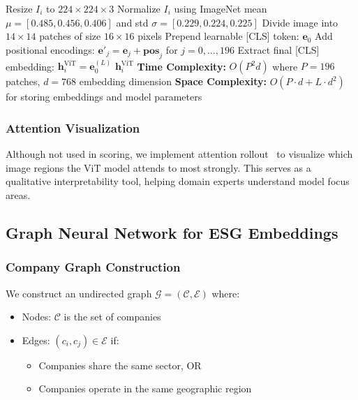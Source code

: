 \begin{algorithm}[H]
\caption{ViT Feature Extraction for ESG Assessment}
\label{alg:vit}
\BlankLine
Resize $I_i$ to $224 \times 224 \times 3$\;
Normalize $I_i$ using ImageNet mean $\mu = [0.485, 0.456, 0.406]$ and std $\sigma = [0.229, 0.224, 0.225]$\;
Divide image into $14 \times 14$ patches of size $16 \times 16$ pixels\;
Prepend learnable [CLS] token: $\mathbf{e}_0$\;
Add positional encodings: $\mathbf{e}'_j = \mathbf{e}_j + \mathbf{pos}_j$ for $j = 0, \ldots, 196$\;
Extract final [CLS] embedding: $\mathbf{h}_i^{\text{ViT}} = \mathbf{e}^{(L)}_0$\;
\Return $\mathbf{h}_i^{\text{ViT}}$\;
\BlankLine
\textbf{Time Complexity:} $O(P^2 d)$ where $P = 196$ patches, $d = 768$ embedding dimension\;
\textbf{Space Complexity:} $O(P \cdot d + L \cdot d^2)$ for storing embeddings and model parameters\;
\end{algorithm}

\subsubsection{Attention Visualization}

Although not used in scoring, we implement attention rollout~\cite{abnar2020attention} to visualize which image regions the ViT model attends to most strongly. This serves as a qualitative interpretability tool, helping domain experts understand model focus areas.

\subsection{Graph Neural Network for ESG Embeddings}

\subsubsection{Company Graph Construction}

We construct an undirected graph $\mathcal{G} = (\mathcal{C}, \mathcal{E})$ where:
\begin{itemize}
\item Nodes: $\mathcal{C}$ is the set of companies
\item Edges: $(c_i, c_j) \in \mathcal{E}$ if:
  \begin{itemize}
  \item Companies share the same sector, OR
  \item Companies operate in the same geographic region
  \end{itemize}
\end{itemize}

